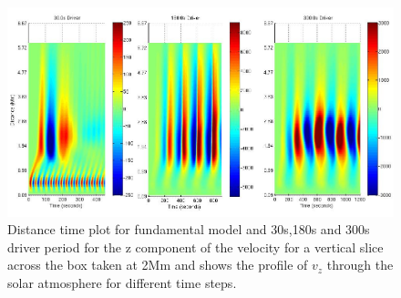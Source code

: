 \documentclass[final,1p]{elsarticle}
\begin{document}



\begin{figure}[h]\label{fig6_dt_30_180_300_0_vert_2Mm}
\includegraphics[scale=0.4]{images/fig4_dt_30_180_300_0_vert_2Mm.jpg}
\caption{Distance time plot for fundamental model and 30s,180s and 300s driver period for the z component of the velocity for a vertical slice across the box  taken at 2Mm and shows  the profile of $v_{z}$ through the solar atmosphere for different time steps. }
\end{figure}


\end{document}
